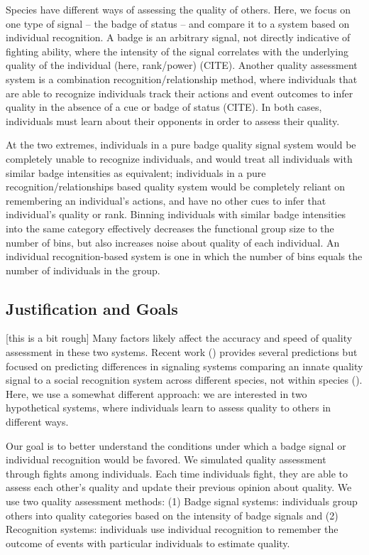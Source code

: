 
Species have different ways of assessing the quality of others. Here, we focus on one type of signal -- the badge of status -- and compare it to a system based on individual recognition. A badge is an arbitrary signal, not directly indicative of fighting ability, where the intensity of the signal correlates with the underlying quality of the individual (here, rank/power) (CITE). Another quality assessment system is a combination recognition/relationship method, where individuals that are able to recognize individuals track their actions and event outcomes to infer quality in the absence of a cue or badge of status (CITE). In both cases, individuals must learn about their opponents in order to assess their quality.

At the two extremes, individuals in a pure badge quality signal system would be completely unable to recognize individuals, and would treat all individuals with similar badge intensities as equivalent; individuals in a pure recognition/relationships based quality system would be completely reliant on remembering an individual's actions, and have no other cues to infer that individual's quality or rank. Binning individuals with similar badge intensities into the same category effectively decreases the functional group size to the number of bins, but also increases noise about quality of each individual. An individual recognition-based system is one in which the number of bins equals the number of individuals in the group.  

\subsection*{Justification and Goals}

[this is a bit rough] Many factors likely affect the accuracy and speed of quality assessment in these two systems. Recent work (\cite{sheehan2016evotradeoff}) provides several predictions but focused on predicting differences in signaling systems comparing an innate quality signal to a social recognition system across different species, not within species (\cite{sheehan2016response}). Here, we use a somewhat different approach: we are interested in two hypothetical systems, where individuals learn to assess quality to others in different ways. 

Our goal is to better understand the conditions under which a badge signal or individual recognition would be favored. We simulated quality assessment through fights among individuals. Each time individuals fight, they are able to assess each other's quality and update their previous opinion about quality. We use two quality assessment methods: (1) Badge signal systems: individuals group others into quality categories based on the intensity of badge signals and (2) Recognition systems: individuals use individual recognition to remember the outcome of events with particular individuals to estimate quality. 

